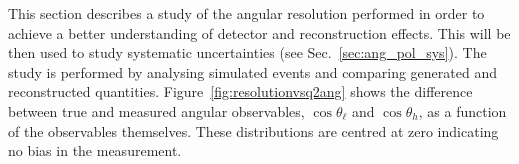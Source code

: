 This section describes a study of the angular resolution performed in order to achieve a better understanding
of detector and reconstruction effects. This will be then used to study systematic uncertainties (see Sec.~\ref{sec:ang_pol_sys}).
The study is performed by analysing simulated events and comparing generated and reconstructed quantities.
Figure~\ref{fig:resolutionvsq2ang} shows the difference between true and measured angular observables,
$\cos \theta_\ell$ and $\cos \theta_h$, as a function of the observables themselves.
These distributions are centred at zero indicating no bias in the measurement.
%
\begin{table}[b]
\centering
\caption{Average angular resolutions integrated over the full interval and the full available \qsq.}
\label{tab:resolutions}
\end{table}
%
